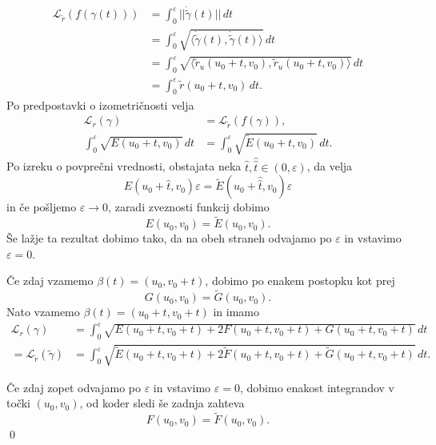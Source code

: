 \documentclass[10pt, a4paper]{article}
\begin{document}
\[ \begin{align*}
  \mathcal{L}_{\tilde{r}}(f(\gamma(t))) &= \int_{0}^{\varepsilon} \lvert\lvert
  \dot{\tilde{\gamma}}(t) \rvert\rvert   \, dt  \\ &= 
  \int_{0}^{\varepsilon} \sqrt{\langle\dot{\tilde{\gamma}}(t), \dot{\tilde{\gamma}}(t)  \rangle} \, dt  \\ &=
  \int_{0}^{\varepsilon} \sqrt{\langle \tilde{r}_u(u_0 + t, v_0), \tilde{r}_u(u_0 + t, v_0) \rangle}   \, dt \\ &= 
  \int_{0}^{\varepsilon} \tilde{r}(u_0 + t, v_0)  \, dt. 
\end{align*} \]
Po predpostavki o izometričnosti velja 
\[ \begin{align*}
    \mathcal{L}_r(\gamma) &= \mathcal{L}_{\tilde{r}}(f(\gamma)), \\
    \int_{0}^{\varepsilon} \sqrt{E(u_0 + t, v_0)}   \, dt  &= \int_{0}^{\varepsilon} \sqrt{\tilde{E}(u_0 + t, v_0)} \, dt.
\end{align*} \]
Po izreku o povprečni vrednosti, obstajata neka $\hat{t}, \hat{\hat{t}} \in  (0, \varepsilon)$, da velja
\[ E(u_0 + \hat{t} , v_0) \varepsilon = \tilde{E}(u_0 + \hat{\hat{t}} , v_0) \varepsilon\]in če pošljemo $\varepsilon \to  0$,
zaradi zveznosti funkcij dobimo 
\[ E(u_0, v_0) = \tilde{E}(u_0, v_0). \]
Še lažje ta rezultat dobimo tako, da na obeh straneh odvajamo po $\varepsilon$ in vstavimo $\varepsilon = 0$.

Če zdaj vzamemo $\beta(t) = (u_0, v_0 + t)$, dobimo po enakem postopku kot prej 
\[ G(u_0, v_0) = \tilde{G}(u_0, v_0). \]
Nato vzamemo $\beta(t) = (u_0 + t, v_0 + t)$ in imamo
\[ \begin{align*}
  \mathcal{L}_r(\gamma) &= \int_{0}^{\varepsilon} \sqrt{E(u_0 + t, v_0 + t) + 2F(u_0 + t, v_0 + t) + G(u_0 + t, v_0 + t)}   \, dt  \\
  = \mathcal{L}_{\tilde{r}}(\tilde{\gamma}) &= \int_{0}^{\varepsilon} \sqrt{\tilde{E}(u_0 + t, v_0 + t) + 2\tilde{F}(u_0 + t, v_0 + t) + \tilde{G}(u_0 + t, v_0 + t)}   \, dt. 
\end{align*} \]

Če zdaj zopet odvajamo po $\varepsilon$ in vstavimo $\varepsilon = 0$, dobimo enakost integrandov v točki $(u_0, v_0)$, od koder sledi še zadnja zahteva
\[ F(u_0, v_0) = \tilde{F}(u_0, v_0). \]
\qed
\end{document}
